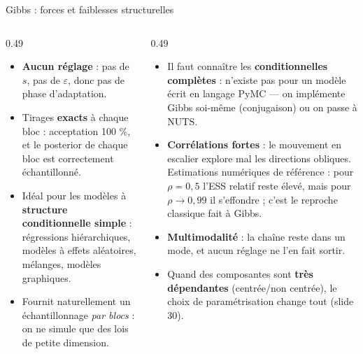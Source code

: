 \begin{frame}{Gibbs : forces et faiblesses structurelles}
\footnotesize
\begin{columns}[t]
\begin{column}{0.49\textwidth}
\begin{kbox}[Forces]
\begin{itemize}
  \item \textbf{Aucun réglage} : pas de $s$, pas de $\varepsilon$, donc pas de
        phase d'adaptation.
  \item Tirages \textbf{exacts} à chaque bloc : acceptation 100 \%, et le
        posterior de chaque bloc est correctement échantillonné.
  \item Idéal pour les modèles à \textbf{structure conditionnelle simple} :
        régressions hiérarchiques, modèles à effets aléatoires, mélanges,
        modèles graphiques.
  \item Fournit naturellement un échantillonnage \emph{par blocs} : on ne
        simule que des lois de petite dimension.
\end{itemize}
\end{kbox}
\end{column}
\begin{column}{0.49\textwidth}
\begin{wbox}[Faiblesses]
\begin{itemize}
  \item Il faut connaître les \textbf{conditionnelles complètes} :
         n'existe pas pour un modèle écrit en langage PyMC --- on
        implémente Gibbs soi-même (conjugaison) ou on passe à NUTS.
  \item \textbf{Corrélations fortes} : le mouvement en escalier explore mal les
        directions obliques. Estimations numériques de référence : pour
        $\rho = 0{,}5$ l'ESS relatif reste élevé, mais pour $\rho \to 0{,}99$ il
        s'effondre ; c'est le reproche classique fait à Gibbs.
  \item \textbf{Multimodalité} : la chaîne reste dans un mode, et aucun
        réglage ne l'en fait sortir.
  \item Quand des composantes sont \textbf{très dépendantes} (centrée/non centrée),
        le choix de paramétrisation change tout (slide 30).
\end{itemize}
\end{wbox}
\end{column}
\end{columns}
\end{frame}

